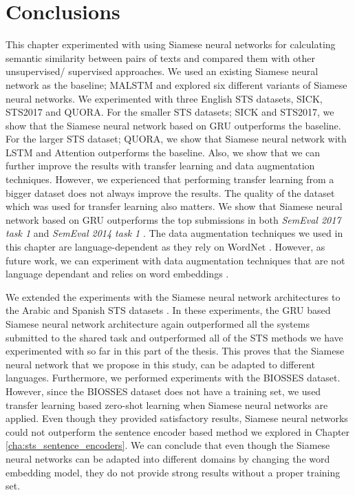 \section{Conclusions}
\label{sec:siamese_conclusions}
This chapter experimented with using Siamese neural networks for calculating semantic similarity between pairs of texts and compared them with other unsupervised/ supervised approaches. We used an existing Siamese neural network as the baseline; MALSTM \autocite{Mueller_Thyagarajan_2016} and explored six different variants of Siamese neural networks. We experimented with three English STS datasets, SICK, STS2017 and QUORA. For the smaller STS datasets; SICK and STS2017, we show that the Siamese neural network based on GRU outperforms the baseline. For the larger STS dataset; QUORA, we show that Siamese neural network with LSTM and Attention outperforms the baseline. Also, we show that we can further improve the results with transfer learning and data augmentation techniques. However, we experienced that performing transfer learning from a bigger dataset does not always improve the results. The quality of the dataset which was used for transfer learning also matters. We show that Siamese neural network based on GRU outperforms the top submissions in both \textit{SemEval 2017 task 1} \autocite{cer-etal-2017-semeval} and  \textit{SemEval 2014 task 1} \autocite{marelli-etal-2014-semeval}. The data augmentation techniques we used in this chapter are language-dependent as they rely on WordNet \autocite{10.1145/219717.219748}. However, as future work, we can experiment with data augmentation techniques that are not language dependant and relies on word embeddings \autocite{kumar-etal-2020-data}. 

We extended the experiments with the Siamese neural network architectures to the Arabic and Spanish STS datasets \autocite{cer-etal-2017-semeval}. In these experiments, the GRU based Siamese neural network architecture again outperformed all the systems submitted to the shared task and outperformed all of the STS methods we have experimented with so far in this part of the thesis. This proves that the Siamese neural network that we propose in this study, can be adapted to different languages. Furthermore, we performed experiments with the BIOSSES dataset. However, since the BIOSSES dataset does not have a training set, we used transfer learning based zero-shot learning when Siamese neural networks are applied. Even though they provided satisfactory results, Siamese neural networks could not outperform the sentence encoder based method we explored in Chapter \ref{cha:sts_sentence_encoders}. We can conclude that even though the Siamese neural networks can be adapted into different domains by changing the word embedding model, they do not provide strong results without a proper training set. 

